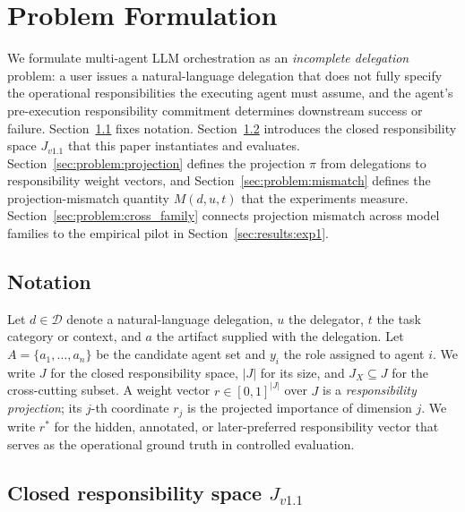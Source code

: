 \section{Problem Formulation}
\label{sec:problem}

We formulate multi-agent LLM orchestration as an \emph{incomplete delegation} problem: a user issues a natural-language delegation that does not fully specify the operational responsibilities the executing agent must assume, and the agent's pre-execution responsibility commitment determines downstream success or failure. Section~\ref{sec:problem:notation} fixes notation. Section~\ref{sec:problem:space} introduces the closed responsibility space $J_{v1.1}$ that this paper instantiates and evaluates. Section~\ref{sec:problem:projection} defines the projection $\pi$ from delegations to responsibility weight vectors, and Section~\ref{sec:problem:mismatch} defines the projection-mismatch quantity $M(d, u, t)$ that the experiments measure. Section~\ref{sec:problem:cross_family} connects projection mismatch across model families to the empirical pilot in Section~\ref{sec:results:exp1}.

\subsection{Notation}
\label{sec:problem:notation}

Let $d \in \mathcal{D}$ denote a natural-language delegation, $u$ the delegator, $t$ the task category or context, and $a$ the artifact supplied with the delegation. Let $A = \{a_1, \dots, a_n\}$ be the candidate agent set and $y_i$ the role assigned to agent $i$. We write $J$ for the closed responsibility space, $|J|$ for its size, and $J_X \subseteq J$ for the cross-cutting subset. A weight vector $r \in [0, 1]^{|J|}$ over $J$ is a \emph{responsibility projection}; its $j$-th coordinate $r_j$ is the projected importance of dimension $j$. We write $r^*$ for the hidden, annotated, or later-preferred responsibility vector that serves as the operational ground truth in controlled evaluation.

\subsection{Closed responsibility space $J_{v1.1}$}
\label{sec:problem:space}

